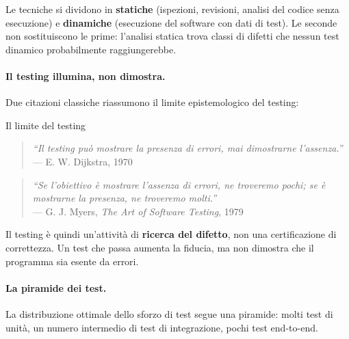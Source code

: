 \documentclass[12pt]{extarticle}
\begin{document}
\noindent Le tecniche si dividono in \textbf{statiche} (ispezioni, revisioni, analisi del codice senza esecuzione) e \textbf{dinamiche} (esecuzione del software con dati di test). Le seconde non sostituiscono le prime: l'analisi statica trova classi di difetti che nessun test dinamico probabilmente raggiungerebbe.

\paragraph{Il testing illumina, non dimostra.}
Due citazioni classiche riassumono il limite epistemologico del testing:

\begin{cbox}{Il limite del testing}
\begin{quote}
\textit{``Il testing può mostrare la presenza di errori, mai dimostrarne l'assenza.''}\\
--- E. W. Dijkstra, 1970
\end{quote}
\begin{quote}
\textit{``Se l'obiettivo è mostrare l'assenza di errori, ne troveremo pochi; se è mostrarne la presenza, ne troveremo molti.''}\\
--- G. J. Myers, \textit{The Art of Software Testing}, 1979
\end{quote}
\noindent Il testing è quindi un'attività di \textbf{ricerca del difetto}, non una certificazione di correttezza. Un test che passa aumenta la fiducia, ma non dimostra che il programma sia esente da errori.
\end{cbox}

\paragraph{La piramide dei test.}
La distribuzione ottimale dello sforzo di test segue una piramide: molti test di unità, un numero intermedio di test di integrazione, pochi test end-to-end.

\begin{center}
\end{center}
\end{document}
